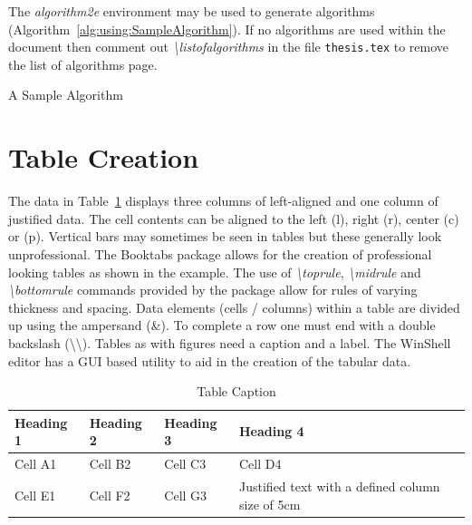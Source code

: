The \emph{algorithm2e} environment \citep{online:Fiorio2016algorithm2e} may be used to generate algorithms (Algorithm~\ref{alg:using:SampleAlgorithm}). If no algorithms are used within the document then comment out \emph{\textbackslash listofalgorithms } in the file {\tt thesis.tex} to remove the list of algorithms page.

\begin{algorithm}
{}
\caption{A Sample Algorithm} \label{alg:using:SampleAlgorithm}
\end{algorithm}


\section{Table Creation}

The data in Table~\ref{tab:using:TableExample} displays three columns of left-aligned and one column of justified data. The cell contents can be aligned to the left (l), right (r), center (c) or (p). Vertical bars may sometimes be seen in tables but these generally look unprofessional. The Booktabs package \citep{online:Fear2016BookTabs} allows for the creation of professional looking tables as shown in the example.  The use of \emph{\textbackslash toprule}, \emph{\textbackslash midrule} and \emph{\textbackslash bottomrule} commands provided by the package allow for rules of varying thickness and spacing. Data elements (cells / columns) within a table are divided up using the ampersand (\&). To complete a row one must end with a double backslash (\textbackslash\textbackslash). Tables as with figures need a caption and a label. The WinShell editor has a GUI based utility to aid in the creation of the tabular data.

\begin{table}[H]
\caption{Table Caption}\label{tab:using:TableExample}
\centering
\small
\begin{tabular}{lllp{5cm}}
\toprule \textbf{Heading 1}& \textbf{Heading 2}&\textbf{Heading 3}&\textbf{Heading 4}\\
\midrule
Cell A1 & Cell B2 & Cell C3 & Cell D4\\
Cell E1 & Cell F2 & Cell G3 & Justified text with a defined column size of 5cm\\
\bottomrule
\end{tabular}
\end{table}





